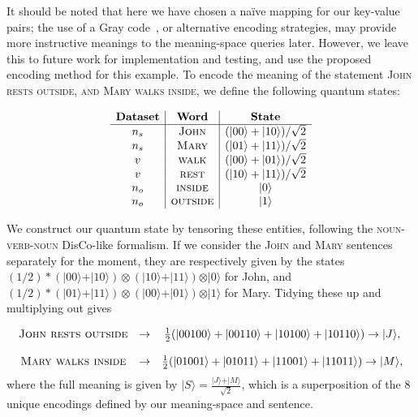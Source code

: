 It should be noted that here we have chosen a na\"ive mapping for our key-value pairs; the use of a Gray code~\cite{gray_code}, or alternative encoding strategies, may provide more instructive meanings to the meaning-space queries later. However, we leave this to future work for implementation and testing, and use the proposed encoding method for this example.
To encode the meaning of the statement \textsc{John rests outside, and Mary walks inside}, we define the following quantum states:

\begin{equation*}
\begin{array}{c|c|c}
\mathbf{Dataset} & \mathbf{Word} & \mathbf{State} \\
\hline
{n_s} & \textsc{John} & (\vert 00 \rangle + \vert 10 \rangle)/\sqrt{2} \\
{n_s} & \textsc{Mary} & (\vert 01 \rangle + \vert 11 \rangle)/\sqrt{2} \\
{v} & \textsc{walk} & (\vert 00 \rangle + \vert 01 \rangle)/\sqrt{2} \\
{v} & \textsc{rest} & (\vert 10 \rangle + \vert 11 \rangle)/\sqrt{2} \\
{n_o} & \textsc{inside} & \vert 0 \rangle  \\
{n_o} & \textsc{outside} & \vert 1 \rangle  \\
\end{array}
\end{equation*}

We construct our quantum state by tensoring these entities, following the \textsc{noun-verb-noun} DisCo-like formalism. If we consider the \textsc{John} and \textsc{Mary} sentences separately for the moment, they are respectively given by the states $(1/2)*(\vert 00 \rangle + \vert 10 \rangle)\otimes (\vert 10 \rangle + \vert 11 \rangle)\otimes \vert 0 \rangle$ for John, and $(1/2)*(\vert 01 \rangle + \vert 11 \rangle)\otimes (\vert 00 \rangle + \vert 01 \rangle)\otimes \vert 1 \rangle$ for Mary. Tidying these up and multiplying out gives 

\begin{equation*}
\begin{array}{ccc}
\textsc{John rests outside} & \rightarrow & \frac{1}{2}(\vert 00100 \rangle + \vert 00110 \rangle +\vert 10100 \rangle +\vert 10110 \rangle) \rightarrow \vert J\rangle, \\
\\
\textsc{Mary walks inside} & \rightarrow & \frac{1}{2}(\vert 01001 \rangle + \vert 01011 \rangle +\vert 11001 \rangle +\vert 11011 \rangle) \rightarrow \vert M\rangle,\\
\end{array}
\end{equation*}
where the full meaning is given by $\vert S\rangle = \frac{\vert J \rangle + \vert M \rangle}{\sqrt{2}}$, which is a superposition of the 8 unique encodings defined by our meaning-space and sentence. 


